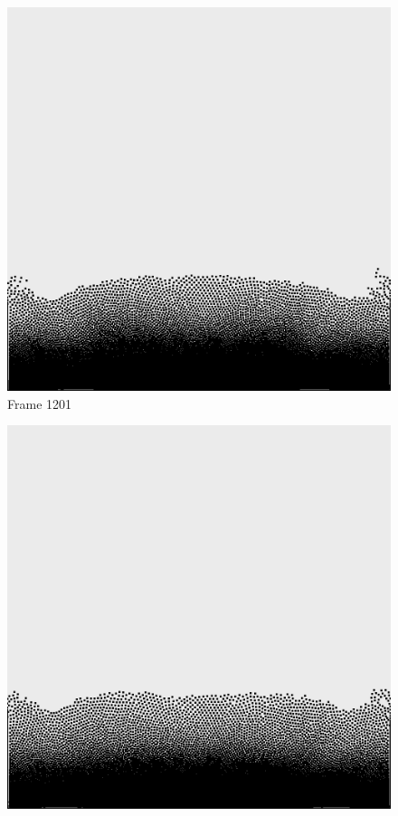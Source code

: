\documentclass[a4paper, 12pt, oneside]{book}
\begin{document}
\begin{figure}[!ht]
        \begin{center}
            \includegraphics[width=\linewidth]{images/test_case_1/1201.png}
            Frame 1201
        \end{center}
    \endminipage
    \hfill
        \begin{center}
            \includegraphics[width=\linewidth]{images/test_case_1/1221.png}

\end{center}
\end{figure}
\end{document}
